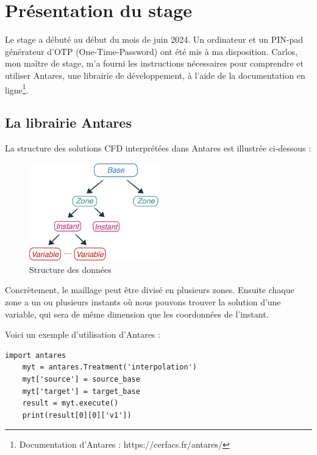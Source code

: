 \chapter{Présentation du stage}

Le stage a débuté au début du mois de juin 2024. Un ordinateur et un PIN-pad générateur d'OTP (One-Time-Password) ont été mis à ma disposition. Carlos, mon maître de stage, m'a fourni les instructions nécessaires pour comprendre et utiliser Antares\cite{antares}, une librairie de développement, à l'aide de la documentation en ligne\footnote{Documentation d'Antares : https://cerfacs.fr/antares/}.

\section{La librairie Antares}

La structure des solutions CFD interprétées dans Antares est illustrée ci-dessous :

\begin{figure}[ht!]
\centering
\includegraphics[width=0.5\textwidth]{images/data_structure_1.png}
\caption{Structure des données}
\end{figure}

Concrètement, le maillage peut être divisé en plusieurs zones.
Ensuite chaque zone a un ou plusieurs instants où nous pouvons trouver la solution d'une variable, qui sera de même dimension que les coordonnées de l'instant.

Voici un exemple d'utilisation d'Antares :

\begin{lstlisting}[caption=Exemple simple d'utilisation d'Antares pour interpoler, label={lst:antares_2}]
    import antares
    myt = antares.Treatment('interpolation')
    myt['source'] = source_base
    myt['target'] = target_base
    result = myt.execute()
    print(result[0][0]['v1'])
\end{lstlisting}

